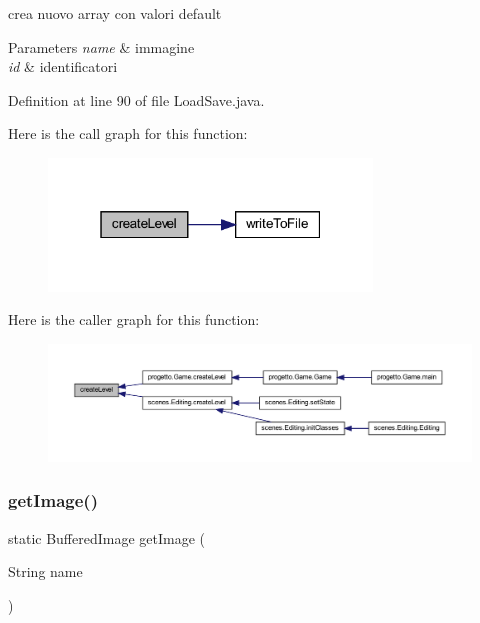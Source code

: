 crea nuovo array con valori default 


\begin{DoxyParams}{Parameters}
{\em name} & immagine \\
\hline
{\em id} & identificatori \\
\hline
\end{DoxyParams}


Definition at line 90 of file Load\+Save.\+java.

Here is the call graph for this function\+:
\nopagebreak
\begin{figure}[H]
\begin{center}
\leavevmode
\includegraphics[width=244pt]{classhelpz_1_1_load_save_a934717f63182b47ab05a70ec40cef235_cgraph}
\end{center}
\end{figure}
Here is the caller graph for this function\+:\nopagebreak
\begin{figure}[H]
\begin{center}
\leavevmode
\includegraphics[width=350pt]{classhelpz_1_1_load_save_a934717f63182b47ab05a70ec40cef235_icgraph}
\end{center}
\end{figure}
\mbox{\label{classhelpz_1_1_load_save_adfcdec0c763af178ffbfea94f4ccd263}} 
\subsubsection{\texorpdfstring{get\+Image()}{getImage()}}
{\footnotesize\ttfamily static Buffered\+Image get\+Image (\begin{DoxyParamCaption}\item[{String}]{name }\end{DoxyParamCaption})\hspace{0.3cm}{\ttfamily [static]}}



